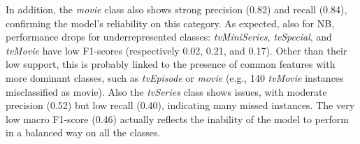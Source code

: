 In addition, the \textit{movie} class also shows strong precision (0.82) and recall (0.84), confirming the model's reliability on this category.
As expected, also for NB, performance drops for underrepresented classes: \textit{tvMiniSeries}, \textit{tvSpecial}, and \textit{tvMovie} have low F1-scores (respectively 0.02, 0.21, and 0.17). 
Other than their low support, this is probably linked to the presence of common features with more dominant classes, such as \textit{tvEpisode} or \textit{movie} (e.g., 140 \textit{tvMovie} instances misclassified as movie). 
Also the \textit{tvSeries} class shows issues, with moderate precision (0.52) but low recall (0.40), indicating many missed instances.
The very low macro F1-score (0.46) actually reflects the inability of the model to perform in a balanced way on all the classes.




